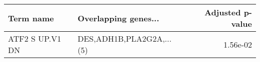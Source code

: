 \begin{tabular}{llr}
\toprule
      Term name &     Overlapping genes... &  Adjusted p-value \\
\midrule
ATF2 S UP.V1 DN & DES,ADH1B,PLA2G2A,...(5) &          1.56e-02 \\
\bottomrule
\end{tabular}
